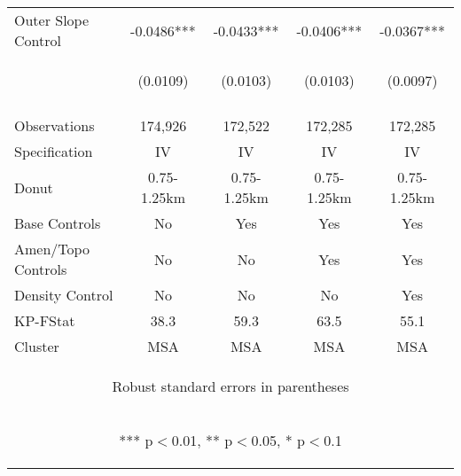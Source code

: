 \begin{tabular}{lcccc}
Outer Slope Control & -0.0486*** & -0.0433*** & -0.0406*** & -0.0367*** \\
 & \begin{footnotesize}(0.0109)\end{footnotesize} & \begin{footnotesize}(0.0103)\end{footnotesize} & \begin{footnotesize}(0.0103)\end{footnotesize} & \begin{footnotesize}(0.0097)\end{footnotesize} \\
\vspace{4pt} & \begin{footnotesize}\end{footnotesize} & \begin{footnotesize}\end{footnotesize} & \begin{footnotesize}\end{footnotesize} & \begin{footnotesize}\end{footnotesize} \\
Observations & 174,926 & 172,522 & 172,285 & 172,285 \\
Specification & IV & IV & IV & IV \\
Donut & 0.75-1.25km & 0.75-1.25km & 0.75-1.25km & 0.75-1.25km \\
Base Controls & No & Yes & Yes & Yes \\
Amen/Topo Controls & No & No & Yes & Yes \\
Density Control & No & No & No & Yes \\
KP-FStat & 38.3 & 59.3 & 63.5 & 55.1 \\
 Cluster & MSA & MSA & MSA & MSA \\ \hline
\multicolumn{5}{c}{\begin{footnotesize} Robust standard errors in parentheses\end{footnotesize}} \\
\multicolumn{5}{c}{\begin{footnotesize} *** p$<$0.01, ** p$<$0.05, * p$<$0.1\end{footnotesize}} \\
\end{tabular}

